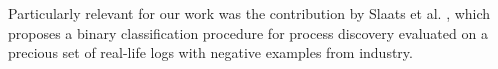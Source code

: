  
Particularly relevant for our work was the contribution by Slaats et al. \cite{DBLP:conf/bpm/SlaatsDB21}, which proposes a binary classification procedure for process discovery evaluated on a precious set of real-life logs with negative examples from industry.
%
%
%
